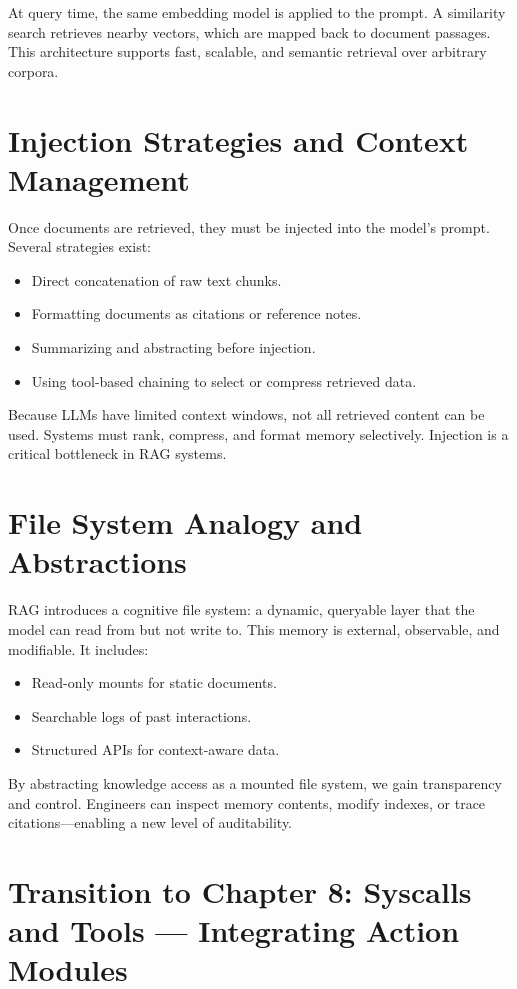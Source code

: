 \documentclass{book}
\begin{document}
At query time, the same embedding model is applied to the prompt. A similarity search retrieves nearby vectors, which are mapped back to document passages. This architecture supports fast, scalable, and semantic retrieval over arbitrary corpora.

\section{Injection Strategies and Context Management}

Once documents are retrieved, they must be injected into the model’s prompt. Several strategies exist:

\begin{itemize}
  \item Direct concatenation of raw text chunks.
  \item Formatting documents as citations or reference notes.
  \item Summarizing and abstracting before injection.
  \item Using tool-based chaining to select or compress retrieved data.
\end{itemize}

Because LLMs have limited context windows, not all retrieved content can be used. Systems must rank, compress, and format memory selectively. Injection is a critical bottleneck in RAG systems.

\section{File System Analogy and Abstractions}

RAG introduces a cognitive file system: a dynamic, queryable layer that the model can read from but not write to. This memory is external, observable, and modifiable. It includes:

\begin{itemize}
  \item Read-only mounts for static documents.
  \item Searchable logs of past interactions.
  \item Structured APIs for context-aware data.
\end{itemize}

By abstracting knowledge access as a mounted file system, we gain transparency and control. Engineers can inspect memory contents, modify indexes, or trace citations—enabling a new level of auditability.

\section*{Transition to Chapter 8: Syscalls and Tools — Integrating Action Modules}
\end{document}

